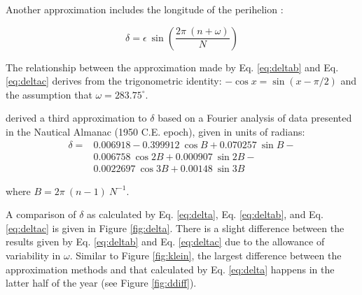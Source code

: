 Another approximation includes the longitude of the perihelion \parencite{cooper69}:

\begin{equation}
\label{eq:deltac}
    \delta = \epsilon\:\sin\left(\frac{2\pi\:(n+\omega)}{N} \right)
\end{equation}

The relationship between the approximation made by Eq. \ref{eq:deltab} and Eq. \ref{eq:deltac} derives from the trigonometric identity: $-\cos x = \sin(x - \pi/2)$ and the assumption that $\omega = 283.75^{\circ}$.

\cite{spencer71} derived a third approximation to $\delta$ based on a Fourier analysis of data presented in the Nautical Almanac (1950 C.E. epoch), given in units of radians:
\begin{equation}
\label{eq:spencer}
\begin{split}
	\delta = & 0.006918 - 0.399912\:\cos B + 0.070257\:\sin B - \\
             & 0.006758 \:\cos 2B + 0.000907\:\sin 2B - \\
             & 0.0022697\:\cos 3B + 0.00148 \:\sin 3B
\end{split}
\end{equation} 

\noindent where $B = 2\pi\:\left(n-1\right)\: N^{-1}$.

A comparison of $\delta$ as calculated by Eq. \ref{eq:delta}, Eq. \ref{eq:deltab}, and Eq. \ref{eq:deltac} is given in Figure \ref{fig:delta}. 
There is a slight difference between the results given by Eq. \ref{eq:deltab} and Eq. \ref{eq:deltac} due to the allowance of variability in $\omega$. 
Similar to Figure \ref{fig:klein}, the largest difference between the approximation methods and that calculated by Eq. \ref{eq:delta} happens in the latter half of the year (see Figure \ref{fig:ddiff}).\\

